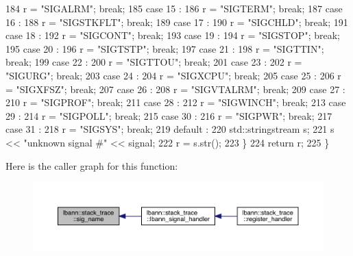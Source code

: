 \begin{DoxyCode}
184       r = \textcolor{stringliteral}{"SIGALRM"}; \textcolor{keywordflow}{break};
185     \textcolor{keywordflow}{case} 15 :
186       r = \textcolor{stringliteral}{"SIGTERM"}; \textcolor{keywordflow}{break};
187     \textcolor{keywordflow}{case} 16 :
188       r = \textcolor{stringliteral}{"SIGSTKFLT"}; \textcolor{keywordflow}{break};
189     \textcolor{keywordflow}{case} 17 :
190       r = \textcolor{stringliteral}{"SIGCHLD"}; \textcolor{keywordflow}{break};
191     \textcolor{keywordflow}{case} 18 :
192       r = \textcolor{stringliteral}{"SIGCONT"}; \textcolor{keywordflow}{break};
193     \textcolor{keywordflow}{case} 19 :
194       r = \textcolor{stringliteral}{"SIGSTOP"}; \textcolor{keywordflow}{break};
195     \textcolor{keywordflow}{case} 20 :
196       r = \textcolor{stringliteral}{"SIGTSTP"}; \textcolor{keywordflow}{break};
197     \textcolor{keywordflow}{case} 21 :
198       r = \textcolor{stringliteral}{"SIGTTIN"}; \textcolor{keywordflow}{break};
199     \textcolor{keywordflow}{case} 22 :
200       r = \textcolor{stringliteral}{"SIGTTOU"}; \textcolor{keywordflow}{break};
201     \textcolor{keywordflow}{case} 23 :
202       r = \textcolor{stringliteral}{"SIGURG"}; \textcolor{keywordflow}{break};
203     \textcolor{keywordflow}{case} 24 :
204       r = \textcolor{stringliteral}{"SIGXCPU"}; \textcolor{keywordflow}{break};
205     \textcolor{keywordflow}{case} 25 :
206       r = \textcolor{stringliteral}{"SIGXFSZ"}; \textcolor{keywordflow}{break};
207     \textcolor{keywordflow}{case} 26 :
208       r = \textcolor{stringliteral}{"SIGVTALRM"}; \textcolor{keywordflow}{break};
209     \textcolor{keywordflow}{case} 27 :
210       r = \textcolor{stringliteral}{"SIGPROF"}; \textcolor{keywordflow}{break};
211     \textcolor{keywordflow}{case} 28 :
212       r = \textcolor{stringliteral}{"SIGWINCH"}; \textcolor{keywordflow}{break};
213     \textcolor{keywordflow}{case} 29 :
214       r = \textcolor{stringliteral}{"SIGPOLL"}; \textcolor{keywordflow}{break};
215     \textcolor{keywordflow}{case} 30 :
216       r = \textcolor{stringliteral}{"SIGPWR"}; \textcolor{keywordflow}{break};
217     \textcolor{keywordflow}{case} 31 :
218       r = \textcolor{stringliteral}{"SIGSYS"}; \textcolor{keywordflow}{break};
219     default :
220       std::stringstream s;
221       s << \textcolor{stringliteral}{"unknown signal #"} << signal;
222       r = s.str();
223   \}
224   \textcolor{keywordflow}{return} r;
225 \}
\end{DoxyCode}
Here is the caller graph for this function\+:\nopagebreak
\begin{figure}[H]
\begin{center}
\leavevmode
\includegraphics[width=350pt]{namespacelbann_1_1stack__trace_a22d63f8c305ad282df5af296d61639e6_icgraph}
\end{center}
\end{figure}


